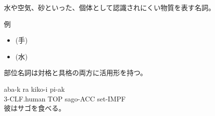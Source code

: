 水や空気、砂といった、個体として認識されにくい物質を表す名詞。

例
\begin{itemize}
\item {} (手)
\item {} (水)
\end{itemize}

部位名詞は対格と具格の両方に活用形を持つ。

\begin{exe}
    \ex \gll aba-k ra kiko-i pi-ak \\
        3-CLF.human TOP sago-ACC set-IMPF \\
        \glt 彼はサゴを食べる。
\end{exe}
